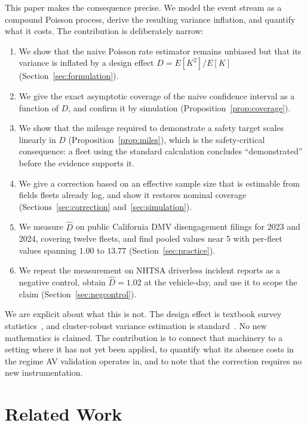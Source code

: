 \documentclass[11pt]{article}
\begin{document}
This paper makes the consequence precise. We model the event stream as a compound
Poisson process, derive the resulting variance inflation, and quantify what it
costs. The contribution is deliberately narrow:

\begin{enumerate}
\item We show that the naive Poisson rate estimator remains unbiased but that its
variance is inflated by a design effect $D = E[K^2]/E[K]$
(Section~\ref{sec:formulation}).
\item We give the exact asymptotic coverage of the naive confidence interval as a
function of $D$, and confirm it by simulation (Proposition~\ref{prop:coverage}).
\item We show that the mileage required to demonstrate a safety target scales
linearly in $D$ (Proposition~\ref{prop:miles}), which is the safety-critical
consequence: a fleet using the standard calculation concludes ``demonstrated''
before the evidence supports it.
\item We give a correction based on an effective sample size that is estimable
from fields fleets already log, and show it restores nominal coverage
(Sections~\ref{sec:correction} and~\ref{sec:simulation}).
\item We measure $\hat{D}$ on public California DMV disengagement filings for
2023 and 2024, covering twelve fleets, and find pooled values near $5$ with
per-fleet values spanning $1.00$ to $13.77$ (Section~\ref{sec:practice}).
\item We repeat the measurement on NHTSA driverless incident reports as a
negative control, obtain $\hat{D} = 1.02$ at the vehicle-day, and use it to scope
the claim (Section~\ref{sec:negcontrol}).
\end{enumerate}

We are explicit about what this is not. The design effect is textbook survey
statistics~\cite{kish1965survey,cochran1977sampling}, and cluster-robust variance
estimation is standard~\cite{liang1986longitudinal}. No new mathematics is claimed.
The contribution is to connect that machinery to a setting where it has not yet
been applied, to quantify what its absence costs in the regime AV validation
operates in, and to note that the correction requires no new instrumentation.

\section{Related Work}
\end{document}
